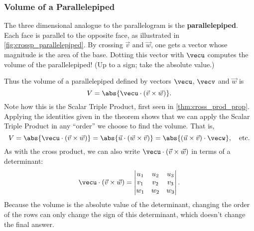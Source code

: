 \subsubsection{Volume of a Parallelepiped}


The three dimensional analogue to the parallelogram is the \textbf{parallelepiped}.
Each face is parallel to the opposite face, as illustrated in \autoref{fig:crossp_parallelepiped}. By crossing $\vec v$ and $\vec w$, one gets a vector whose magnitude is the area of the base. Dotting this vector with $\vecu$ computes the volume of the parallelepiped! (Up to a sign; take the absolute value.)

%
%
%
%

Thus the volume of a parallelepiped defined by vectors $\vecu$, $\vecv$ and $\vec w$ is
\begin{equation}
V = \abs{\vecu\cdot (\vec v\times\vec w)}.\label{eq:crossp2}
\end{equation}
Note how this is the Scalar Triple Product, first seen in \autoref{thm:cross_prod_prop}. Applying the identities given in the theorem shows that we can apply the Scalar Triple Product in any ``order'' we choose to find the volume. That is,
\[V = \abs{\vecu\cdot(\vec v\times\vec w)} = \abs{\vec u\cdot (\vec w\times\vec v)} = \abs{(\vec u\times\vec v)\cdot \vecw},\quad \text{etc.}\]
As with the cross product, we can also write $\vecu\cdot(\vec v\times\vec w)$ in terms of a determinant:
\[
 \vecu\cdot(\vec v\times\vec w)=
 \begin{vmatrix}u_1&u_2&u_3\\v_1&v_2&v_3\\w_1&w_2&w_3\end{vmatrix}.
\]
Because
%
%
the volume is the absolute value of the determinant, changing the order of the rows can only change the sign of this determinant, which doesn't change the final answer.


